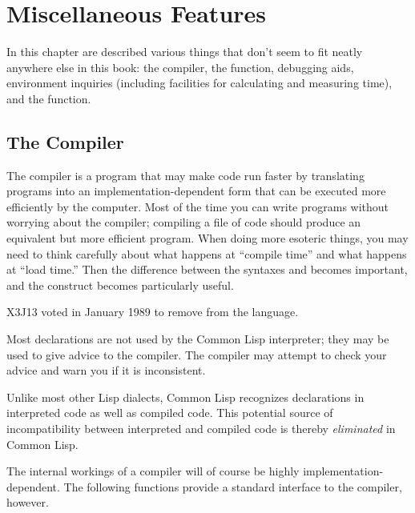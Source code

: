 
\clearpage\def\pagestatus{FINAL PROOF}

\chapter{Miscellaneous Features}

In this chapter are described various things that don't
seem to fit neatly anywhere else in this book:
the compiler, the 
function, debugging aids, environment inquiries (including facilities
for calculating and measuring time), and the  function.

\section{The Compiler}
\label{COMPILER-SECTION}

\begin{obsolete}\noindent
The compiler is a program that may make code run faster by translating
programs into an implementation-dependent form that can
be executed more efficiently by the computer.  Most of the time
you can write programs without worrying about the compiler;
compiling a file of code should produce an equivalent but more
efficient program.  When doing more esoteric things, you may need to
think carefully about what happens at ``compile time'' and what happens
at ``load time.''  Then the difference between the syntaxes 
and \cd{\#,} becomes important, and the  construct
becomes particularly useful.
\end{obsolete}

\begin{newer}
X3J13 voted in January 1989
 to remove \cd{\#,} from the language.
\end{newer}

\everypar{}
Most declarations are not used by the Common Lisp interpreter;
they may be used to give advice to the compiler.  The compiler may attempt
to check your advice and warn you if it is inconsistent.

Unlike most other Lisp dialects, Common Lisp recognizes 
declarations in interpreted code as well as compiled code.
This potential source of incompatibility between interpreted and compiled
code is thereby {\it eliminated} in Common Lisp.

The internal workings of a compiler will of course be highly
implementation-dependent.  The following functions provide a standard
interface to the compiler, however.


